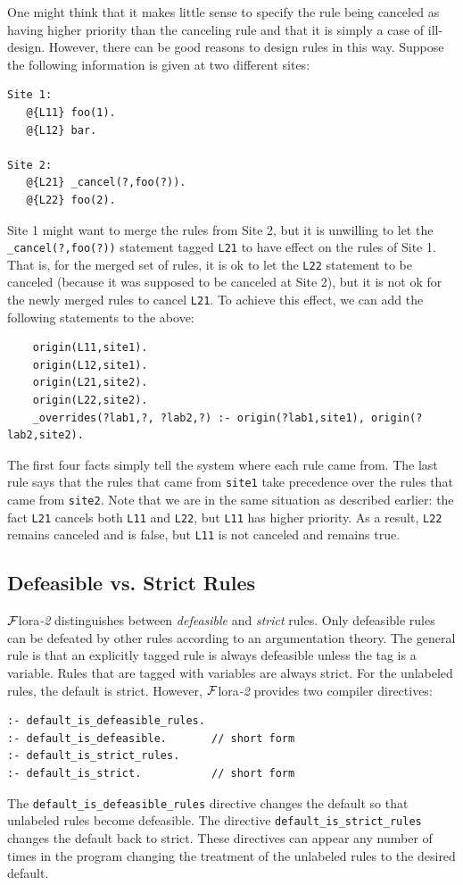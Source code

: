 \documentclass[11pt]{article}
\newcommand{\FLORA}{{\mbox{\sc ${\cal F}${lora}\rm\emph{-2}}}\xspace}
\begin{document}
One might think that it makes little sense to specify the rule being
canceled as having higher priority than the canceling rule and that it is
simply a case of ill-design. However, there can be good reasons to design
rules in this way. Suppose the following information is given at two different sites:
\begin{verbatim}
Site 1:
   @{L11} foo(1).
   @{L12} bar.

Site 2:
   @{L21} _cancel(?,foo(?)).  
   @{L22} foo(2).
\end{verbatim}
Site 1 might want to merge the rules from Site 2, but it is unwilling to
let the {\tt \_cancel(?,foo(?))} statement tagged {\tt L21} to have effect
on the rules of Site 1. That is, for the merged set of rules, it is ok to
let the {\tt L22} statement to be canceled (because it was supposed to be
canceled at Site 2), but it is not ok for the newly merged rules to cancel
{\tt L21}. To achieve this effect, we can add the following statements to
the above:
\begin{verbatim}
    origin(L11,site1).
    origin(L12,site1).
    origin(L21,site2).
    origin(L22,site2).
    _overrides(?lab1,?, ?lab2,?) :- origin(?lab1,site1), origin(?lab2,site2).
\end{verbatim}
The first four facts simply tell the system where each rule came from.  The
last rule says that the rules that came from {\tt site1} take precedence
over the rules that came from {\tt site2}.  Note that we are in the same
situation as described earlier: the fact {\tt L21} cancels both {\tt L11}
and {\tt L22}, but {\tt L11} has higher priority. As a result, {\tt L22}
remains canceled and is false, but {\tt L11} is not canceled and remains
true.

\subsection{Defeasible vs. Strict Rules}

\FLORA distinguishes between \emph{defeasible} and \emph{strict} rules.
Only defeasible rules can be defeated by other rules according to an
argumentation theory.
The general rule is that an explicitly tagged rule is always defeasible
unless the tag is a variable. Rules that are tagged with variables are
always strict.
For the unlabeled rules, the default is strict. However, \FLORA provides
two compiler directives:
\begin{verbatim}
:- default_is_defeasible_rules.
:- default_is_defeasible.       // short form
:- default_is_strict_rules.
:- default_is_strict.           // short form
\end{verbatim}
The \verb|default_is_defeasible_rules| directive changes the default so
that unlabeled rules become defeasible. The directive
\verb|default_is_strict_rules| changes the default back to strict.
These directives can appear any number of times in the program
changing the treatment of the unlabeled rules to the desired default.
\end{document}
